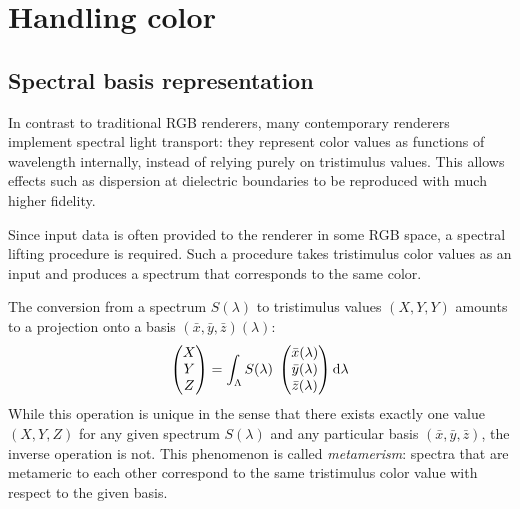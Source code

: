
\chapter{Handling color}\label{ch:color}

\section{Spectral basis representation}
\label{sec:spec_basis}

In contrast to traditional RGB renderers, many contemporary renderers implement 
spectral light transport: they represent color values as functions of wavelength
internally, instead of relying purely on tristimulus values.
This allows effects such
as dispersion at dielectric boundaries to be reproduced with much higher fidelity.

Since input data is often provided to the renderer in some \gls{RGB} space,
a spectral lifting procedure is required. Such a procedure takes
tristimulus color values as an input and produces a spectrum that
corresponds to the same color.

The conversion from a spectrum $S(\lambda)$ to tristimulus values 
$(X, Y, Y)$ amounts to a projection onto a basis $(\bar x, \bar y, \bar z)(\lambda)$:
\begin{equation}
    \begin{pmatrix}X\\Y\\Z\end{pmatrix}
        = \int_\Lambda S(\lambda)\; 
    \begin{pmatrix}
        \bar x(\lambda)\\
        \bar y(\lambda)\\
        \bar z(\lambda)
    \end{pmatrix}
    \mathop{}\!\mathrm{d}\lambda
    \label{eqn:color_matching}
\end{equation}
While this operation is unique in the sense that there exists exactly one
value $(X,Y,Z)$ for any given spectrum $S(\lambda)$ and any particular basis
$(\bar x,\bar y, \bar z)$, the inverse operation is not. This phenomenon is called
\emph{metamerism}: spectra that are metameric to each other correspond to the
same tristimulus color value with respect to the given basis.

